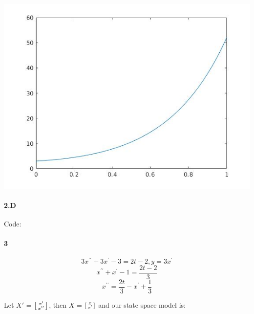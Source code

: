 \documentclass{article}
\begin{document}
       \includegraphics[scale=0.5]{task2c_plot.jpg}
        
        
    
    \newpage
    
     \paragraph{2.D}
     
    Code:
     
     
     
     \paragraph{3}
     
     $$3x^{\prime\prime} + 3x^{\prime} - 3 = 2t - 2, y = 3x^{\prime}$$
     $$x^{\prime\prime} + x^{\prime} - 1 = \frac{2t - 2}{3}$$
     $$x^{\prime\prime} = \frac{2t}{3} - x^{\prime} + \frac{1}{3}$$
     
     Let $X'$ = $\begin{bsmallmatrix}
            x^{\prime}\\
            x^{\prime\prime}
        \end{bsmallmatrix}$, then $X$ = $\begin{bsmallmatrix}
                                            x\\
                                            x^{\prime}
                                        \end{bsmallmatrix}$
    and our state space model is:
    
\end{document}
